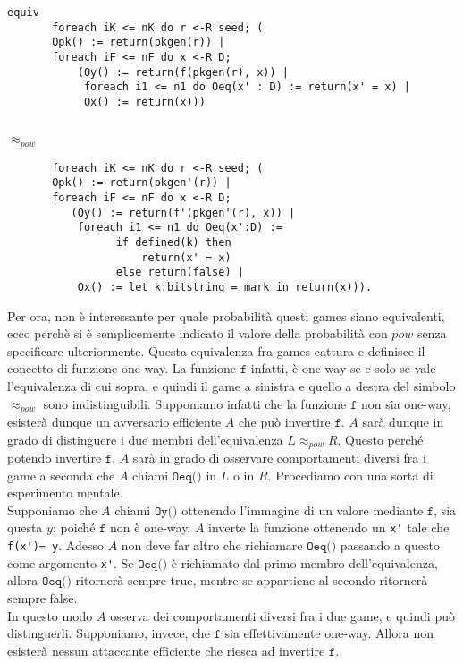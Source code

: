 \documentclass[a4paper,openright,twoside,12pt]{report}
\begin{document}
\begin{verbatim}
equiv 
       foreach iK <= nK do r <-R seed; (
       Opk() := return(pkgen(r)) |
       foreach iF <= nF do x <-R D;
           (Oy() := return(f(pkgen(r), x)) |
            foreach i1 <= n1 do Oeq(x' : D) := return(x' = x) |
            Ox() := return(x)))
   
\end{verbatim}
\texttt{$\approx _{pow}$} 
\begin{verbatim}       
       foreach iK <= nK do r <-R seed; (
       Opk() := return(pkgen'(r)) |
       foreach iF <= nF do x <-R D;
          (Oy() := return(f'(pkgen'(r), x)) |
           foreach i1 <= n1 do Oeq(x':D) :=
                 if defined(k) then 
                     return(x' = x) 
                 else return(false) |
           Ox() := let k:bitstring = mark in return(x))).
 \end{verbatim}
Per ora, non \`e interessante per quale probabilit\`a questi games siano equivalenti, ecco perch\`e si \`e semplicemente indicato il valore della probabilit\`a con $pow$ senza specificare ulteriormente.
Questa equivalenza fra games cattura e definisce il concetto di funzione one-way. La funzione $\texttt{f}$ infatti, \`e one-way se e solo se vale l'equivalenza di cui sopra, 
e quindi il game a sinistra e quello a destra del simbolo \textbf{$\approx _{pow}$} sono indistinguibili.
Supponiamo infatti che la funzione $\texttt{f}$ non sia one-way, esister\`a dunque un avversario efficiente $A$ 
che pu\`o invertire $\texttt{f}$. $A$ sar\`a dunque in grado di distinguere i due membri dell'equivalenza $L \approx_{pow} R$. 
Questo perch\'e potendo invertire $\texttt{f}$, $A$ sar\`a in grado di osservare comportamenti diversi fra i game a seconda che $A$ chiami $\texttt{Oeq()}$ in $L$ o in $R$.
Procediamo con una sorta di esperimento mentale.\\ 
Supponiamo che $A$ chiami $\texttt{Oy()}$ ottenendo l'immagine di un valore mediante $\texttt{f}$, sia questa $y$; poich\'e $\texttt{f}$ non \`e one-way, 
$A$ inverte la funzione ottenendo un \verb!x'! tale che \verb!f(x')= y!.
Adesso $A$ non deve far altro che richiamare $\texttt{Oeq()}$ passando a questo come argomento \verb!x'!. Se $\texttt{Oeq()}$ \`e richiamato dal primo membro dell'equivalenza, 
allora $\texttt{Oeq()}$ ritorner\`a sempre true, mentre se appartiene al secondo ritorner\`a sempre false.\\
In questo modo $A$ osserva dei comportamenti diversi fra i due game, e quindi pu\`o distinguerli. 
Supponiamo, invece, che $\texttt{f}$ sia effettivamente one-way. Allora non esister\`a nessun attaccante efficiente che riesca ad invertire $\texttt{f}$.
\end{document}
